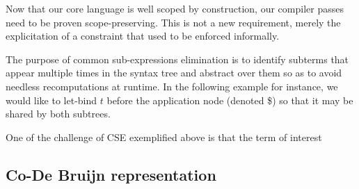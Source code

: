 

Now that our core language is well scoped by construction, our compiler passes
need to be proven scope-preserving.
%
This is not a new requirement, merely the explicitation of a constraint that
used to be enforced informally.


The purpose of common sub-expressions elimination is to identify subterms
that appear multiple times in the syntax tree and abstract over them so
as to avoid needless recomputations at runtime.
%
In the following example for instance, we would like to let-bind $t$ before
the application node (denoted \$) so that it may be shared by both subtrees.

\cseexamplegraph{}

One of the challenge of CSE exemplified above is that the term of interest

\subsection{Co-De Bruijn representation}
